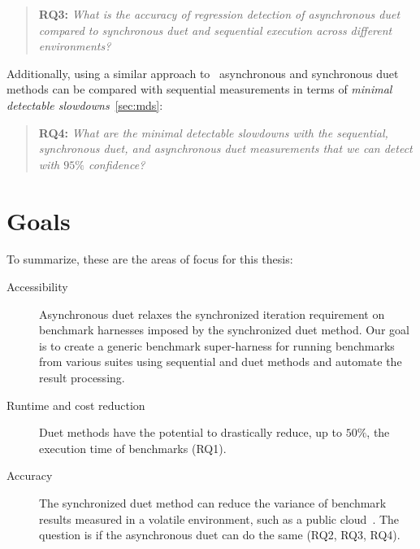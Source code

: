 \begin{quote}
	\textbf{RQ3:} \emph{What is the accuracy of regression detection of asynchronous duet compared to synchronous duet and sequential execution across different environments?}
\end{quote}

Additionally, using a similar approach to~\citet{laaber2019software} asynchronous and synchronous duet methods can be compared with sequential measurements in terms of \emph{minimal detectable slowdowns}~\cref{sec:mds}:

\begin{quote}
	\textbf{RQ4:} \emph{What are the minimal detectable slowdowns with the sequential, synchronous duet, and asynchronous duet measurements that we can detect with $95\%$ confidence?}
\end{quote}

\section{Goals}
\label{sec:goals}

To summarize, these are the areas of focus for this thesis:
\begin{description}
	\item[Accessibility]
		Asynchronous duet relaxes the synchronized iteration requirement on benchmark harnesses imposed by the synchronized duet method.
		Our goal is to create a generic benchmark super-harness for running benchmarks from various suites using sequential and duet methods and automate the result processing.
	\item[Runtime and cost reduction]
		Duet methods have the potential to drastically reduce, up to $50\%$, the execution time of benchmarks (RQ1).
	\item[Accuracy]
		The synchronized duet method can reduce the variance of benchmark results measured in a volatile environment, such as a public cloud~\cite{bulej2020duet}.
		The question is if the asynchronous duet can do the same (RQ2, RQ3, RQ4).
\end{description}
